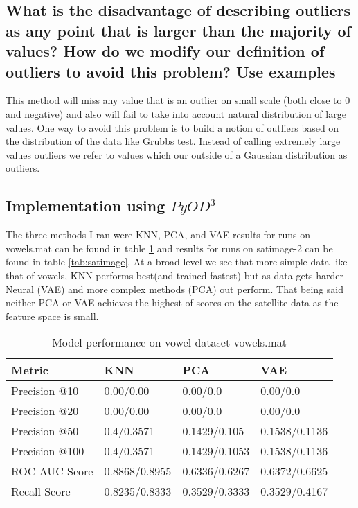 \documentclass[11pt]{article}
\begin{document}
\subsection{What is the disadvantage of describing outliers as any point that is larger than the majority of values? How do we modify our definition of outliers to avoid this problem? Use examples }
This method will miss any value that is an outlier on small scale (both close to 0 and negative) and also will fail to take into account natural distribution of large values. One way to avoid this problem is to build a notion of outliers based on the distribution of the data like Grubbs test. Instead of calling extremely large values outliers we refer to values which our outside of a Gaussian distribution as outliers. 
\subsection{Implementation using $PyOD^3$}
The three methods I ran were KNN, PCA, and VAE results for runs on vowels.mat can be found in table \ref{tab:vowels} and results for runs on satimage-2 can be found in table \ref{tab:satimage}. At a broad level we see that more simple data like that of vowels, KNN performs best(and trained fastest) but as data gets harder Neural (VAE) and more complex methods (PCA) out perform. That being said neither PCA or VAE achieves the highest of scores on the satellite data as the feature space is small. 
\begin{table}[]
\begin{tabular}{|l|l|l|l|}
Metric        & KNN & PCA     & VAE  \\ \hline
Precision @10 & 0.00/0.00       & 0.00/0.0    &  0.00/0.0   \\ \hline
Precision @20 & 0.00/0.00       & 0.00/0.0    &  0.00/0.0     \\ \hline
Precision @50 & 0.4/0.3571      & 0.1429/0.105 & 0.1538/0.1136 \\ \hline
Precision @100 & 0.4/0.3571      & 0.1429/0.1053 & 0.1538/0.1136 \\ \hline
ROC AUC Score & 0.8868/0.8955   & 0.6336/0.6267 & 0.6372/0.6625 \\ \hline
Recall Score  & 0.8235/0.8333   & 0.3529/0.3333 & 0.3529/0.4167 \hline
\end{tabular}
\caption{Model performance on vowel dataset vowels.mat}
\label{tab:vowels}
\end{table}
\end{document}
